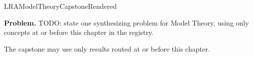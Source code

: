 \ifcsname LRAModelTheoryCapstoneRendered\endcsname
\else
\expandafter\gdef\csname LRAModelTheoryCapstoneRendered\endcsname{}

\newpage
{}
\label{cap:model-theory}

\begin{tcolorbox}[
  colback=gray!6,
  colframe=gray!40,
  arc=2pt,
  left=8pt, right=8pt, top=6pt, bottom=6pt,
  title={\small\textbf{Capstone Problem}},
  fonttitle=\small\bfseries
]
\textbf{Problem.}
TODO: state one synthesizing problem for Model Theory, using only concepts at or
before this chapter in the registry.
\end{tcolorbox}

\begin{remark*}
The capstone may use only results routed at or before this chapter.
\end{remark*}

\clearpage
\fi
